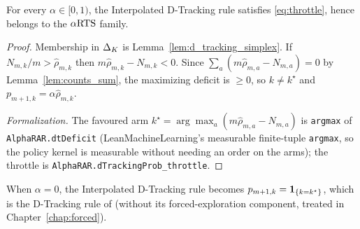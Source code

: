 \begin{lemma}\label{lem:d_tracking_isARTS}
\leanok
{}
For every $\alpha \in [0,1)$, the Interpolated D-Tracking rule satisfies
\eqref{eq:throttle}, hence belongs to the $\alpha\text{RTS}$ family.
\end{lemma}

\begin{proof}\leanok
{}
Membership in $\Delta_K$ is Lemma~\ref{lem:d_tracking_simplex}.
If $N_{m,k}/m > \hat{\rho}_{m,k}$ then $m\hat{\rho}_{m,k} - N_{m,k} < 0$. Since
$\sum_a (m\hat{\rho}_{m,a} - N_{m,a}) = 0$ by Lemma~\ref{lem:counts_sum}, the
maximizing deficit is $\ge 0$, so $k \ne k^\star$ and
$p_{m+1,k} = \alpha\hat{\rho}_{m,k}$.

\emph{Formalization.} The favoured arm $k^\star=\arg\max_a(m\hat\rho_{m,a}-N_{m,a})$ is
\texttt{argmax} of \texttt{AlphaRAR.dtDeficit} (LeanMachineLearning's measurable finite-tuple
\texttt{argmax}, so the policy kernel is measurable without needing an order on the arms); the
throttle is \texttt{AlphaRAR.dTrackingProb\_throttle}.
\end{proof}

\begin{remark}\label{rem:d_tracking_zero}
When $\alpha = 0$, the Interpolated D-Tracking rule becomes
$p_{m+1,k} = \mathbf{1}_{\{k = k^\star\}}$, which is the D-Tracking rule of
\cite{garivier2016optimal} (without its forced-exploration component, treated in
Chapter~\ref{chap:forced}).
\end{remark}
